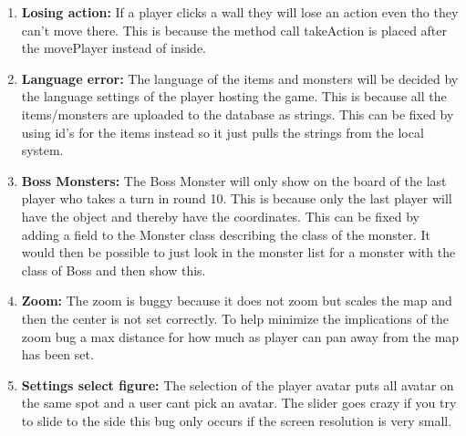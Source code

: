 \begin{enumerate}
	\item \textbf{Losing action:} If a player clicks a wall they will lose an action even tho they can't move there. This is because the method call takeAction is placed after the movePlayer instead of inside.
	
	\item \textbf{Language error:} The language of the items and monsters will be decided by the language settings of the player hosting the game. This is because all the items/monsters are uploaded to the database as strings. This can be fixed by using id's for the items instead so it just pulls the strings from the local system.
	
	\item \textbf{Boss Monsters:} The Boss Monster will only show on the board of the last player who takes a turn in round 10. This is because only the last player will have the object and thereby have the coordinates. This can be fixed by adding a field to the Monster class describing the class of the monster. It would then be possible to just look in the monster list for a monster with the class of Boss and then show this.%
	
	\item \textbf{Zoom:} The zoom is buggy because it does not zoom but scales the map and then the center is not set correctly. To help minimize the implications of the zoom bug a max distance for how much as player can pan away from the map has been set.

	\item \textbf{Settings select figure:} The selection of the player avatar puts all avatar on the same spot and a user cant pick an avatar. The slider goes crazy if you try to slide to the side this bug only occurs if the screen resolution is very small.
	
\end{enumerate}